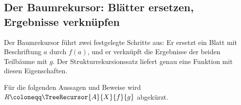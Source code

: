 \subsection{Der Baumrekursor: Blätter ersetzen, Ergebnisse verknüpfen}

Der Baumrekursor führt zwei festgelegte Schritte aus: Er ersetzt ein Blatt
mit Beschriftung \(a\) durch \(f(a)\), und er verknüpft die Ergebnisse der
beiden Teilbäume mit \(g\). Der Strukturrekursionssatz liefert genau eine
Funktion mit diesen Eigenschaften.


Für die folgenden Aussagen und Beweise wird
\(R\coloneqq\TreeRecursor{A}{X}{f}{g}\) abgekürzt.

